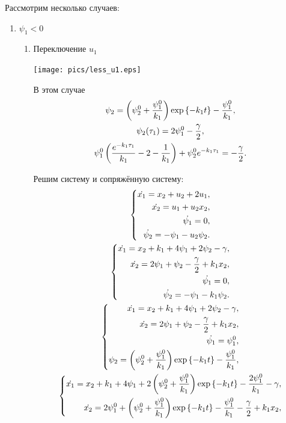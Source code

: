 \documentclass[11pt]{article}
\begin{document}
Рассмотрим несколько случаев:
\begin{enumerate}
\item $\psi_1 < 0$
\begin{enumerate}
\item Переключение $u_1$

\texttt{[image: pics/less\_u1.eps]}

В этом случае
\begin{gather}
\psi_2 = \left( \psi_2^0 + \frac{\psi_1^0}{k_1} \right) \exp \left\{ -k_1t \right\} - \frac{\psi_1^0}{k_1}, \notag \\
\psi_2(\tau_1) = 2\psi_1^0 - \frac{\gamma}{2}, \notag \\
\psi_1^0 \left( \frac{e^{-k_1\tau_1}}{k_1} - 2 - \frac{1}{k_1} \right) + \psi_2^0 e^{-k_1\tau_1} = -\frac{\gamma}{2}. \notag
\end{gather}

Решим систему и сопряжённую систему:
\begin{gather}
\left\{ 
\begin{aligned}
\dot{x_1} = x_2 + u_2 + 2u_1, \\
\dot{x_2} = u_1 + u_2 x_2, \\
\dot{\psi_1} = 0, \\
\dot{\psi_2} = -\psi_1 - u_2 \psi_2.
\end{aligned}
\right. \notag \\
\left\{ 
\begin{aligned}
\dot{x_1} = x_2 + k_1 + 4\psi_1 + 2\psi_2 - \gamma, \\
\dot{x_2} = 2\psi_1 + \psi_2 - \frac{\gamma}{2} + k_1 x_2, \\
\dot{\psi_1} = 0, \\
\dot{\psi_2} = -\psi_1 - k_1 \psi_2.
\end{aligned}
\right. \notag \\
\left\{ 
\begin{aligned}
\dot{x_1} = x_2 + k_1 + 4\psi_1 + 2\psi_2 - \gamma, \\
\dot{x_2} = 2\psi_1 + \psi_2 - \frac{\gamma}{2} + k_1 x_2, \\
\dot{\psi_1} = \psi_1^0, \\
\psi_2 = \left( \psi_2^0 + \frac{\psi_1^0}{k_1} \right) \exp \left\{ -k_1t \right\} - \frac{\psi_1^0}{k_1}, \\
\end{aligned}
\right. \notag \\
\left\{ 
\begin{aligned}
\dot{x_1} = x_2 + k_1 + 4\psi_1 + 2\left( \psi_2^0 + \frac{\psi_1^0}{k_1} \right) \exp \left\{ -k_1t \right\} - \frac{2\psi_1^0}{k_1} - \gamma, \\
\dot{x_2} = 2\psi_1^0 + \left( \psi_2^0 + \frac{\psi_1^0}{k_1} \right) \exp \left\{ -k_1t \right\} - \frac{\psi_1^0}{k_1} - \frac{\gamma}{2} + k_1 x_2, \\
\end{aligned}
\right. \notag
\end{gather}


\end{enumerate}
\end{enumerate}
\end{document}
